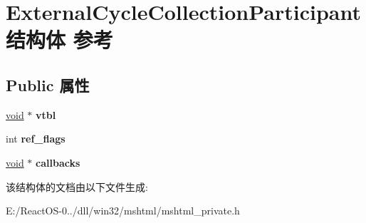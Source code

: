 \hypertarget{struct_external_cycle_collection_participant}{}\section{External\+Cycle\+Collection\+Participant结构体 参考}
\label{struct_external_cycle_collection_participant}
\subsection*{Public 属性}
\begin{DoxyCompactItemize}
\item 
\mbox{\label{struct_external_cycle_collection_participant_a92e5d32f4ff1330a84ca6662f0049a84}} 
\hyperlink{interfacevoid}{void} $\ast$ {\bfseries vtbl}
\item 
\mbox{\label{struct_external_cycle_collection_participant_a4bee13bd63204a3f5a55b9fe4bd3a1c0}} 
int {\bfseries ref\+\_\+flags}
\item 
\mbox{\label{struct_external_cycle_collection_participant_a39aaabe41df982a041c31867d3944265}} 
\hyperlink{interfacevoid}{void} $\ast$ {\bfseries callbacks}
\end{DoxyCompactItemize}


该结构体的文档由以下文件生成\+:\begin{DoxyCompactItemize}
\item 
E\+:/\+React\+O\+S-\/0../dll/win32/mshtml/mshtml\+\_\+private.\+h\end{DoxyCompactItemize}
